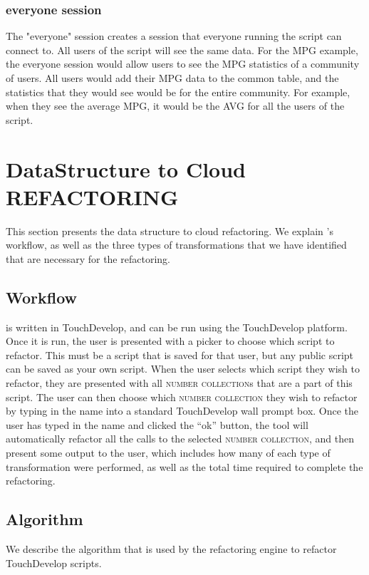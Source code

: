 \documentclass{sigplanconf}
\begin{document}
\subsubsection{everyone session}
The "everyone" session creates a session that everyone running the script can connect to.  All users of the script will see the same data.  For the MPG example, the everyone session would allow users to see the MPG statistics of a community of users.  All users would add their MPG data to the common table, and the statistics that they would see would be for the entire community.  For example, when they see the average MPG, it would be the AVG for all the users of the script.



  
\section{DataStructure to Cloud REFACTORING}
\label{sec:Refactoring}
This section presents the data structure to cloud refactoring.  We explain \tool's workflow, as well as the three types of transformations that we have identified that are necessary for the refactoring. 

\subsection{Workflow}
\tool is written in TouchDevelop, and can be run using the TouchDevelop platform.  Once it is run, the user is presented with a picker to choose which script to refactor.  This must be a script that is saved for that user, but any public script can be saved as your own script. When the user selects which script they wish to refactor, they are presented with all \textsc{number collection}s that are a part of this script.  The user can then choose which \textsc{number collection} they wish to refactor by typing in the name into a standard TouchDevelop wall prompt box. Once the user has typed in the name and clicked the ``ok'' button, the tool will automatically refactor all the calls to the selected \textsc{number collection}, and then present some output to the user, which includes how many of each type of transformation were performed, as well as the total time required to complete the refactoring. 


\subsection{Algorithm}
We describe the algorithm that is used by the refactoring engine to refactor TouchDevelop scripts.   
\end{document}
